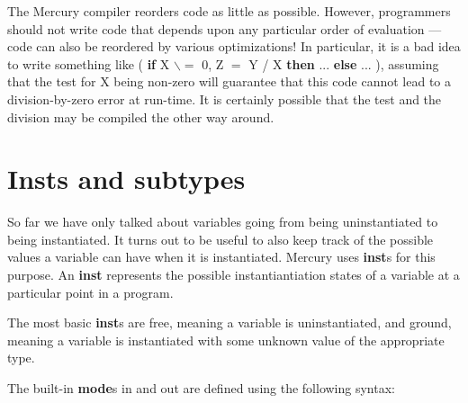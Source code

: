 \documentclass[a4paper,11pt,notitlepage,onecolumn]{book}
\begin{document}
\Note The Mercury compiler reorders code as little as possible.  However,
programmers should not write code that depends upon any particular order of
evaluation --- code can also be reordered by various optimizations!  In
particular, it is a bad idea to write something like
\textsf{( \textbf{if} X {\ensuremath{\backslash}}{\ensuremath{=}} 0, Z {\ensuremath{=}} Y / X \textbf{then} ... \textbf{else} ... )}, assuming that the test for \textsf{X}
being non-zero will guarantee that this code cannot lead to a
division-by-zero error at run-time.  It is certainly possible that the test
and the division may be compiled the other way around.

\section{Insts and subtypes}

So far we have only talked about variables going from being uninstantiated
to being instantiated.  It turns out to be useful to also keep track of the
possible values a variable can have when it is instantiated.  Mercury uses
\textsf{\textbf{inst}}s for this purpose.  An \textsf{\textbf{inst}} represents the possible
instantiantiation states of a variable at a particular point in a program.

The most basic \textsf{\textbf{inst}}s are \textsf{free}, meaning a variable is uninstantiated, and
\textsf{ground}, meaning a variable is instantiated with some unknown value of the
appropriate type.

The built-in \textsf{\textbf{mode}}s \textsf{in} and \textsf{out} are defined using the following syntax:

\begin{small}

\begin{ptabular}
\nextline
{}
\nextline
\end{ptabular}

\end{small}
\end{document}
